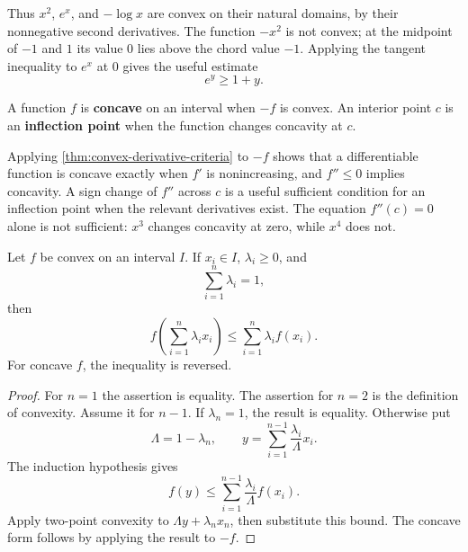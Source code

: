 Thus $x^2$, $e^x$, and $-\log x$ are convex on their natural domains, by
their nonnegative second derivatives.  The function $-x^2$ is not convex;
at the midpoint of $-1$ and $1$ its value $0$ lies above the chord value
$-1$.  Applying the tangent inequality to $e^x$ at $0$ gives the useful
estimate
\[
e^y\geq1+y.
\]

\begin{definition}
\label{def:concavity-inflection}
A function \(f\) is \textbf{concave} on an interval when \(-f\) is convex.
An interior point \(c\) is an \textbf{inflection point} when the function
changes concavity at \(c\).
\end{definition}
Applying \cref{thm:convex-derivative-criteria} to \(-f\) shows that a
differentiable function is concave exactly when \(f'\) is nonincreasing,
and \(f''\leq0\) implies concavity. A sign change of \(f''\) across \(c\)
is a useful sufficient condition for an inflection point when the relevant
derivatives exist. The equation \(f''(c)=0\) alone is not sufficient:
\(x^3\) changes concavity at zero, while \(x^4\) does not.

\begin{theorem}
\label{thm:finite-jensen}
Let \(f\) be convex on an interval \(I\). If \(x_i\in I\),
\(\lambda_i\geq0\), and
\[
\sum_{i=1}^n\lambda_i=1,
\]
then
\[
\boxed{
f\!\left(\sum_{i=1}^n\lambda_i x_i\right)
\leq\sum_{i=1}^n\lambda_i f(x_i).}
\]
For concave \(f\), the inequality is reversed.
\end{theorem}
\begin{proof}
For $n=1$ the assertion is equality. The assertion for $n=2$ is the
definition of convexity. Assume it for
\(n-1\). If \(\lambda_n=1\), the result is equality. Otherwise put
\[
\Lambda=1-\lambda_n,\qquad
y=\sum_{i=1}^{n-1}\frac{\lambda_i}{\Lambda}x_i.
\]
The induction hypothesis gives
\[
f(y)\leq\sum_{i=1}^{n-1}\frac{\lambda_i}{\Lambda}f(x_i).
\]
Apply two-point convexity to
\(\Lambda y+\lambda_nx_n\), then substitute this bound. The concave form
follows by applying the result to \(-f\).
\end{proof}


